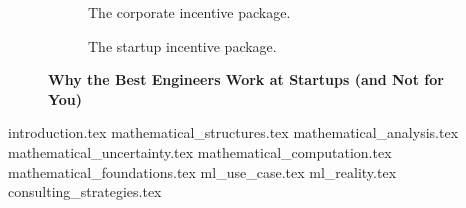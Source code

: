 \documentclass{article}
\begin{document}
\begin{titlepage}
\begin{figure}[H]
      \begin{subfigure}[t]{0.45\textwidth}
      \centering
      \caption*{The corporate incentive package.}
      \end{subfigure}
      \hfill
      \begin{subfigure}[t]{0.45\textwidth}
      \centering
      \caption*{The startup incentive package.}
      \end{subfigure}
      
      \caption*{\textbf{Why the Best Engineers Work at Startups (and Not for You)}}
    \end{figure}
      
  
  \end{titlepage}
  


  \tableofcontents

  \newpage


  {introduction.tex}
  {mathematical_structures.tex}
  {mathematical_analysis.tex}
  {mathematical_uncertainty.tex}
  {mathematical_computation.tex}
  {mathematical_foundations.tex}
  {ml_use_case.tex}
  {ml_reality.tex}
  {consulting_strategies.tex}
\end{document}
